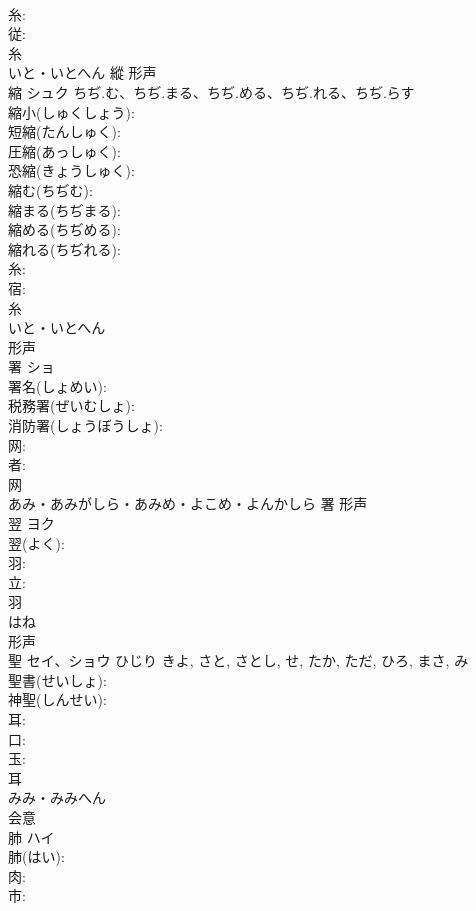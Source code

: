 \documentclass[8pt]{extreport}
\begin{document}
\begin{CJK}{UTF8}{min}
\\	糸: 
\\	従: 
\\	糸	
\\	いと・いとへん	縱	形声 
\\	縮	シュク	ちぢ.む、ちぢ.まる、ちぢ.める、ちぢ.れる、ちぢ.らす		
\\	縮小(しゅくしょう): 
\\	短縮(たんしゅく): 
\\	圧縮(あっしゅく): 
\\	恐縮(きょうしゅく): 
\\	縮む(ちぢむ): 
\\	縮まる(ちぢまる): 
\\	縮める(ちぢめる): 
\\	縮れる(ちぢれる): 
\\	糸: 
\\	宿: 
\\	糸	
\\	いと・いとへん	
\\	形声 
\\	署	ショ			
\\	署名(しょめい): 
\\	税務署(ぜいむしょ): 
\\	消防署(しょうぼうしょ): 
\\	网: 
\\	者: 
\\	网	
\\	あみ・あみがしら・あみめ・よこめ・よんかしら	署	形声 
\\	翌	ヨク			
\\	翌(よく): 
\\	羽: 
\\	立: 
\\	羽	
\\	はね	
\\	形声 
\\	聖	セイ、ショウ	ひじり	きよ, さと, さとし, せ, たか, ただ, ひろ, まさ, み	
\\	聖書(せいしょ): 
\\	神聖(しんせい): 
\\	耳: 
\\	口: 
\\	玉: 
\\	耳	
\\	みみ・みみへん	
\\	会意 
\\	肺	ハイ			
\\	肺(はい): 
\\	肉: 
\\	市: 

\end{CJK}
\end{document}
